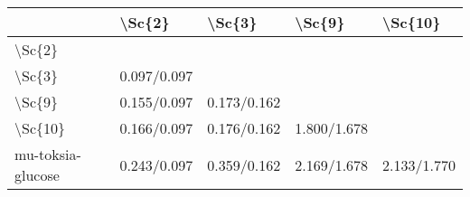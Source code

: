 \begin{tabular}{lllll}
\toprule
{} &       \textbackslash Sc\{2\} &       \textbackslash Sc\{3\} &       \textbackslash Sc\{9\} &      \textbackslash Sc\{10\} \\
\midrule
\textbackslash Sc\{2\}            &              &              &              &              \\
\textbackslash Sc\{3\}            &  0.097/0.097 &              &              &              \\
\textbackslash Sc\{9\}            &  0.155/0.097 &  0.173/0.162 &              &              \\
\textbackslash Sc\{10\}           &  0.166/0.097 &  0.176/0.162 &  1.800/1.678 &              \\
mu-toksia-glucose &  0.243/0.097 &  0.359/0.162 &  2.169/1.678 &  2.133/1.770 \\
\bottomrule
\end{tabular}
